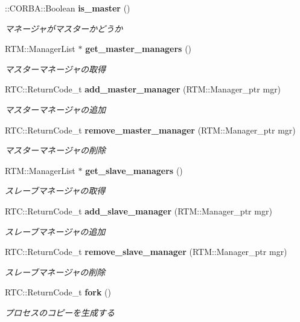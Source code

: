 \begin{DoxyCompactItemize}
::CORBA::Boolean {\bf is\_\-master} ()
\begin{DoxyCompactList}\small\item\em マネージャがマスターかどうか \item\end{DoxyCompactList}\item 
RTM::ManagerList $\ast$ {\bf get\_\-master\_\-managers} ()
\begin{DoxyCompactList}\small\item\em マスターマネージャの取得 \item\end{DoxyCompactList}\item 
RTC::ReturnCode\_\-t {\bf add\_\-master\_\-manager} (RTM::Manager\_\-ptr mgr)
\begin{DoxyCompactList}\small\item\em マスターマネージャの追加 \item\end{DoxyCompactList}\item 
RTC::ReturnCode\_\-t {\bf remove\_\-master\_\-manager} (RTM::Manager\_\-ptr mgr)
\begin{DoxyCompactList}\small\item\em マスターマネージャの削除 \item\end{DoxyCompactList}\item 
RTM::ManagerList $\ast$ {\bf get\_\-slave\_\-managers} ()
\begin{DoxyCompactList}\small\item\em スレーブマネージャの取得 \item\end{DoxyCompactList}\item 
RTC::ReturnCode\_\-t {\bf add\_\-slave\_\-manager} (RTM::Manager\_\-ptr mgr)
\begin{DoxyCompactList}\small\item\em スレーブマネージャの追加 \item\end{DoxyCompactList}\item 
RTC::ReturnCode\_\-t {\bf remove\_\-slave\_\-manager} (RTM::Manager\_\-ptr mgr)
\begin{DoxyCompactList}\small\item\em スレーブマネージャの削除 \item\end{DoxyCompactList}\item 
RTC::ReturnCode\_\-t {\bf fork} ()
\begin{DoxyCompactList}\small\item\em プロセスのコピーを生成する \item\end{DoxyCompactList}\item 

\end{DoxyCompactItemize}
